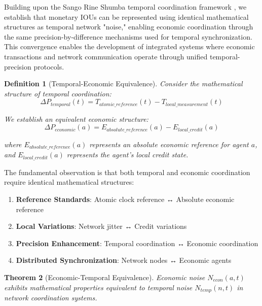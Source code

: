 \documentclass[12pt,a4paper]{article}
\newtheorem{theorem}{Theorem}
\newtheorem{definition}[theorem]{Definition}
\begin{document}
Building upon the Sango Rine Shumba temporal coordination framework \cite{sachikonye2025sango}, we establish that monetary IOUs can be represented using identical mathematical structures as temporal network "noise," enabling economic coordination through the same precision-by-difference mechanisms used for temporal synchronization. This convergence enables the development of integrated systems where economic transactions and network communication operate through unified temporal-precision protocols.

\begin{definition}[Temporal-Economic Equivalence]
Consider the mathematical structure of temporal coordination:
\begin{equation}
\Delta P_{temporal}(t) = T_{atomic\_reference}(t) - T_{local\_measurement}(t)
\end{equation}

We establish an equivalent economic structure:
\begin{equation}
\Delta P_{economic}(a) = E_{absolute\_reference}(a) - E_{local\_credit}(a)
\end{equation}

where $E_{absolute\_reference}(a)$ represents an absolute economic reference for agent $a$, and $E_{local\_credit}(a)$ represents the agent's local credit state.
\end{definition}

The fundamental observation is that both temporal and economic coordination require identical mathematical structures:

\begin{enumerate}
\item \textbf{Reference Standards}: Atomic clock reference ↔ Absolute economic reference
\item \textbf{Local Variations}: Network jitter ↔ Credit variations  
\item \textbf{Precision Enhancement}: Temporal coordination ↔ Economic coordination
\item \textbf{Distributed Synchronization}: Network nodes ↔ Economic agents
\end{enumerate}

\begin{theorem}[Economic-Temporal Equivalence]
Economic noise $N_{econ}(a,t)$ exhibits mathematical properties equivalent to temporal noise $N_{temp}(n,t)$ in network coordination systems.
\end{theorem}
\end{document}

